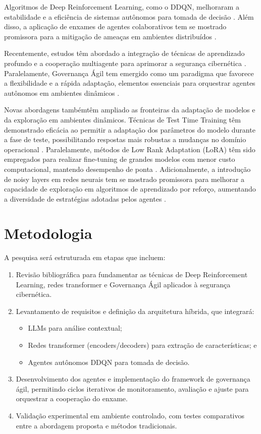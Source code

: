 \documentclass[article,12pt,a4paper]{abntex2}
\begin{document}
Algoritmos de Deep Reinforcement Learning, como o DDQN, melhoraram a estabilidade e a eficiência de sistemas autônomos para tomada de decisão \cite{hasselt2016}. Além disso, a aplicação de enxames de agentes colaborativos tem se mostrado promissora para a mitigação de ameaças em ambientes distribuídos \cite{bonabeau1999,StoneVeloso2000}. 

Recentemente, estudos têm abordado a integração de técnicas de aprendizado profundo e a cooperação multiagente para aprimorar a segurança cibernética \cite{kim2020,liu2021,wang2022,zhang2021}. Paralelamente, Governança Ágil tem emergido como um paradigma que favorece a flexibilidade e a rápida adaptação, elementos essenciais para orquestrar agentes autônomos em ambientes dinâmicos \cite{agilegov2020,agilegov2021}.

Novas abordagens tambémtêm ampliado as fronteiras da adaptação de modelos e da exploração em ambientes dinâmicos. Técnicas de Test Time Training têm demonstrado eficácia ao permitir a adaptação dos parâmetros do modelo durante a fase de teste, possibilitando respostas mais robustas a mudanças no domínio operacional \cite{testtimet2024}. Paralelamente, métodos de Low Rank Adaptation (LoRA) têm sido empregados para realizar fine-tuning de grandes modelos com menor custo computacional, mantendo desempenho de ponta \cite{lora2024}. Adicionalmente, a introdução de noisy layers em redes neurais tem se mostrado promissora para melhorar a capacidade de exploração em algoritmos de aprendizado por reforço, aumentando a diversidade de estratégias adotadas pelos agentes \cite{noisylayers2024}.

\section{Metodologia}
A pesquisa será estruturada em etapas que incluem:
\begin{enumerate}
  \item Revisão bibliográfica para fundamentar as técnicas de Deep Reinforcement Learning, redes transformer e Governança Ágil aplicados à segurança cibernética.
  \item Levantamento de requisitos e definição da arquitetura híbrida, que integrará:
    \begin{itemize}
      \item LLMs para análise contextual;
      \item Redes transformer (encoders/decoders) para extração de características; e
      \item Agentes autônomos DDQN para tomada de decisão.
    \end{itemize}
  \item Desenvolvimento dos agentes e implementação do framework de governança ágil, permitindo ciclos iterativos de monitoramento, avaliação e ajuste para orquestrar a cooperação do enxame.
  \item Validação experimental em ambiente controlado, com testes comparativos entre a abordagem proposta e métodos tradicionais.
\end{enumerate}
\end{document}
